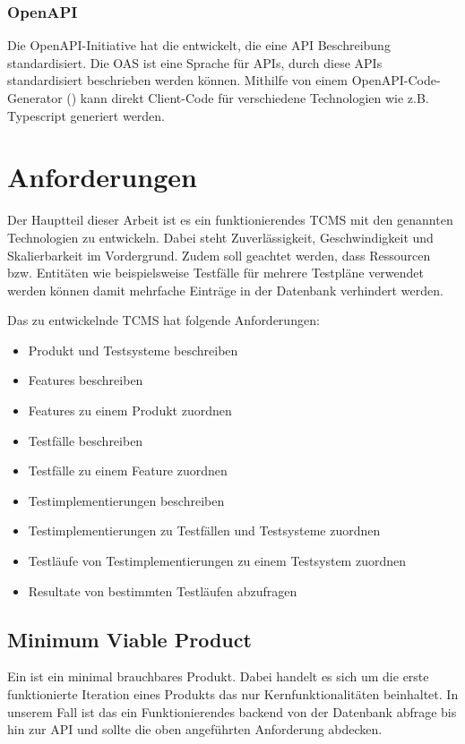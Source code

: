 \documentclass[a4paper, fontsize=11pt, parskip=half, twoside]{scrreprt}
\begin{document}
	\textcite{billwagner_net_nodate}
	
	\subsection{OpenAPI}
	Die OpenAPI-Initiative hat die  entwickelt, die eine \ac{API} Beschreibung standardisiert.
	Die \ac{OAS} ist eine Sprache für  \ac{API}s, durch diese \ac{API}s standardisiert beschrieben werden können. 
	Mithilfe von einem OpenAPI-Code-Generator (\textcite{noauthor_openapi_nodate-1}) kann direkt Client-Code für verschiedene Technologien wie z.B. Typescript generiert werden.
	
	\textcite{noauthor_openapi_nodate}
	
	
	\chapter{Anforderungen} \label{chapter:requiremnts}
	Der Hauptteil dieser Arbeit ist es ein funktionierendes \ac{TCMS} mit den genannten Technologien zu entwickeln.
	Dabei steht Zuverlässigkeit, Geschwindigkeit und Skalierbarkeit im Vordergrund.
	Zudem soll geachtet werden, dass Ressourcen bzw. Entitäten wie beispielsweise Testfälle für mehrere Testpläne verwendet werden können damit mehrfache Einträge in der Datenbank verhindert werden.
	
	Das zu entwickelnde \ac{TCMS} hat folgende Anforderungen:
	
	\begin{itemize}
		\setlength\itemsep{-0.5em}
		\item Produkt und Testsysteme beschreiben
		\item Features beschreiben
		\item Features zu einem Produkt zuordnen
		\item Testfälle beschreiben
		\item Testfälle zu einem Feature zuordnen
		\item Testimplementierungen beschreiben
		\item Testimplementierungen zu Testfällen und Testsysteme zuordnen
		\item Testläufe von Testimplementierungen zu einem Testsystem zuordnen
		\item Resultate von bestimmten Testläufen abzufragen
	\end{itemize}
	
	
	\section{Minimum Viable Product}
	Ein  ist ein minimal brauchbares Produkt. 
	Dabei handelt es sich um die erste funktionierte Iteration eines Produkts das nur Kernfunktionalitäten beinhaltet.
	In unserem Fall ist das ein Funktionierendes backend von der Datenbank abfrage bis hin zur \ac{API} und sollte die oben angeführten Anforderung abdecken.
	
\end{document}
